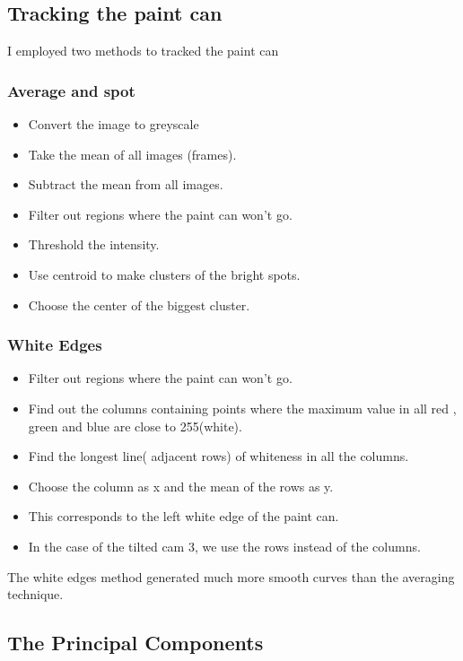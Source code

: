 \documentclass[a4paper]{article}
\begin{document}
\subsection{Tracking the paint can}

I employed two methods to tracked the paint can 
\subsubsection{Average and spot}
\begin{itemize}
	\item Convert the image to greyscale
	\item Take the mean of all images (frames).
	\item Subtract the mean from all images.
	\item Filter out regions where the paint can won't go.
	\item Threshold the intensity.
	\item Use centroid to make clusters of the bright spots.
	\item Choose the center of the biggest cluster.
\end{itemize}

\subsubsection{White Edges}
\begin{itemize}
	\item Filter out regions where the paint can won't go.
	\item Find out the columns containing points where the maximum value in all red , green and blue are close to 255(white).
	\item Find the longest line( adjacent rows) of whiteness in all the columns.
	\item Choose the column as x and the mean of the rows as y.
	\item This corresponds to the left white edge of the paint can.
	\item In the case of the tilted cam 3, we use the rows instead of the columns.
	
\end{itemize}

The white edges method generated much more smooth curves than the averaging technique.


\subsection{The Principal Components}
\end{document}
